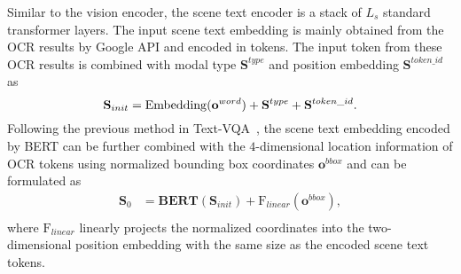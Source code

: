 \documentclass[10pt,twocolumn,letterpaper]{article}
\begin{document}
Similar to the vision encoder, the scene text encoder is a stack of $L_s$ standard transformer layers. The input scene text embedding is mainly obtained from the OCR results by Google API \cite{Google_api} and encoded in tokens. The input token from these OCR results is combined with modal type $\mathbf{S}^{type}$ and position embedding $\mathbf{S}^{token\_id}$ as
\begin{equation}
    \mathbf{S}_{init} = \mathrm{Embedding}(\mathbf{o}^{word}) + \mathbf{S}^{type} + \mathbf{S}^{token\_id}. \\
\end{equation}
Following the previous method in Text-VQA~\cite{M4C}, the scene text embedding encoded by BERT \cite{BERT} can be further combined with the $4$-dimensional location information of OCR tokens using normalized bounding box coordinates $\mathbf{o}^{bbox}$ and can be formulated as\vspace{-0.5em}
\begin{equation}
\begin{aligned}
    \mathbf{S}_0 &= \mathbf{BERT}(\mathbf{S}_{init}) + \mathrm{F}_{linear}(\mathbf{o}^{bbox}), \\ 
\end{aligned}
\end{equation}
where $\mathrm{F}_{linear}$ linearly projects the normalized coordinates into the two-dimensional position embedding with the same size as the encoded scene text tokens. 


\begin{table*}
\caption{Dataset split for the evaluation of cross-modal retrieval tasks. Note that $\ast$ indicates that the CTC-5K test samples have been excluded from the MSCOCO train split.}\vspace{-0.5em}
\label{Tab-setting}
\centering
{}
\end{table*}
\end{document}
